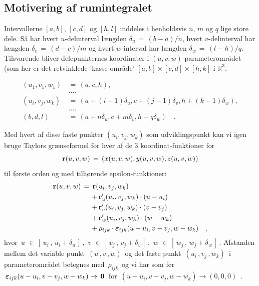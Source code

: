 




\subsection{Motivering af rumintegralet}\label{subsecMotivRum}
Intervallerne $[a, b]$,
 $[c, d]$ og  $[h,l]$ inddeles i henholdsvis $n$, $m$ og $q$
lige store dele. Så har hvert $u$-delinterval længden $\delta_{u} \,
= \, (b-a)/n$, hvert $v$-delinterval har længden $\delta_{v} \, = \,
(d-c)/m$ og hvert $w$-interval har længden $\delta_{w} \, = \,
(l-h)/q$. Tilsvarende bliver delepunkternes koordinater i $(u, v,
w)$-parameterområdet (som her er det retvinklede 'kasse-område'
$[a,b]\times[c,d]\times[h, k]$ i $\mathbb{R}^{3}$.


\begin{equation}
\begin{aligned}
(u_{1}, v_{1}, w_{1}) \, &= \, (a, c, h), \\
&.... \\
(u_{i}, v_{j}, w_{k}) \, &= \,
(a + (i-1)\delta_{u}, c + (j-1)\delta_{v}, h + (k-1)\delta_{w}), \\
 &.... \\
(b, d, l) \, &= \, (a + n\delta_{u}, c + m\delta_{v}, h +
q\delta_{w}) \quad .
\end{aligned}
\end{equation}

Med hvert af disse faste punkter $(u_{i}, v_{j}, w_{k})$ som udviklingspunkt kan vi igen
bruge Taylors grænseformel for hver af de 3 koordinat-funktioner for $${\bf r}(u,
v, w) \, = \, \left(x(u,v,w), y(u,v,w), z(u,v,w)\right)$$ til første orden og med tilhørende
epsilon-funktioner:
\begin{equation} \label{eqTaylor3}
\begin{aligned}
{\bf {r}}(u, v, w) \, = \, {\bf r}(& u_{i}, v_{j}, w_{k}) \\
+ \, &{\bf r}'_{u}(u_{i}, v_{j}, w_{k})\cdot(u-u_{i}) \\
+ \, &{\bf r}'_{v}(u_{i}, v_{j}, w_{k})\cdot(v-v_{j})  \\
+ \, &{\bf r}'_{w}(u_{i}, v_{j}, w_{k})\cdot(w-w_{k}) \\
+ \, & \rho_{ijk}\cdot{\bm{\varepsilon}}_{ijk}(u-u_{i}, v-v_{j},
w-w_{k}) \quad ,
\end{aligned}
\end{equation}
hvor $\, u\, \, \in\, \left[\, u_{i}\, , \,  u_{i} +
\delta_{u}\,\right]\, , \,\, v\, \, \in\, \left[\, v_{j}\, , \,
v_{j} + \delta_{v}\,\right]\, , \,\, w\, \, \in\, \left[\, w_{j}\, ,
\, w_{j} + \delta_{w}\,\right]\,$. Afstanden mellem det variable
punkt $\,(u\,,v\,, w)\,$ og det faste punkt $\,(u_{i}\,,v_{j}\,,
w_{k})\,$ i parameterområdet betegnes med $\,\rho_{ijk}\,$ og vi har
som før $\,{\bm{\varepsilon}}_{ijk}(u-u_{i}, v-v_{j}, w-w_{k}) \to
\, {\bf{0}}\, $ for $\, (u-u_{i}, v-v_{j}, w-w_{k}) \to (0, 0, 0)
\,$ .


